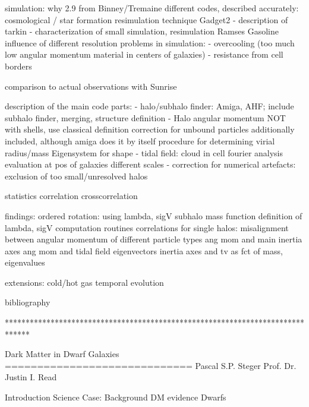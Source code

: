 
simulation: why
2.9 from Binney/Tremaine
different codes, described accurately:
cosmological / star formation
resimulation technique
Gadget2
- description of tarkin
- characterization of small simulation, resimulation
Ramses
Gasoline
influence of different resolution
problems in simulation:
- overcooling (too much low angular momentum material in centers of galaxies)
- resistance from cell borders

comparison to actual observations with Sunrise

description of the main code parts:
- halo/subhalo finder: Amiga, AHF;
	include subhalo finder, merging, structure definition
- Halo
	angular momentum NOT with shells, use classical definition
	correction for unbound particles additionally included, although 
	amiga does it by itself
	procedure for determining virial radius/mass
	Eigensystem for shape
- tidal field:
	cloud in cell
	fourier analysis
	evaluation at pos of galaxies
	different scales
- correction for numerical artefacts: exclusion of too small/unresolved halos

statistics
	correlation
	crosscorrelation

findings:
	ordered rotation: using lambda, sigV
	subhalo mass function
	definition of lambda, sigV
	computation routines
	correlations for single halos: misalignment between
		angular momentum of different particle types
		ang mom and main inertia axes
		ang mom and tidal field eigenvectors
		inertia axes and tv
	as fct of mass, eigenvalues
	
extensions:
	cold/hot gas
	temporal evolution
	
bibliography

******************************************************************************

Dark Matter in Dwarf Galaxies
=============================
Pascal S.P. Steger
Prof. Dr. Justin I. Read

Introduction
Science Case: Background
                DM
                        evidence
              Dwarfs
              